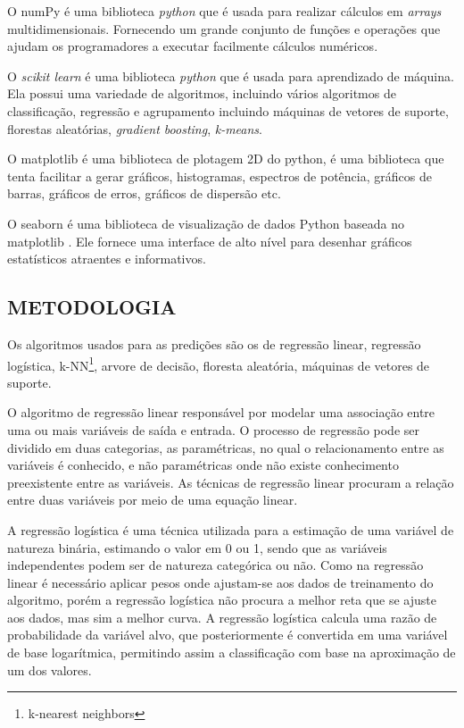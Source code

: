 O numPy é uma biblioteca \textit{python} que é usada para realizar cálculos em \textit{arrays} multidimensionais. Fornecendo um grande conjunto de funções e operações que ajudam os programadores a executar facilmente cálculos numéricos.\cite{numpy}

O \textit{scikit learn} é uma biblioteca \textit{python} que é usada para aprendizado de máquina. Ela possui uma variedade de algoritmos, incluindo vários algoritmos de classificação, regressão e agrupamento incluindo máquinas de vetores de suporte, florestas aleatórias, \textit{gradient boosting}, \textit{k-means}\cite{scikit}.

O matplotlib é uma biblioteca de plotagem 2D do python, é uma biblioteca que tenta facilitar a gerar gráficos, histogramas, espectros de potência, gráficos de barras, gráficos de erros, gráficos de dispersão etc\cite{matplotlib}.

O seaborn é uma biblioteca de visualização de dados Python baseada no matplotlib . Ele fornece uma interface de alto nível para desenhar gráficos estatísticos atraentes e informativos.\cite{seaborn}


\subsection{METODOLOGIA}
Os algoritmos usados para as predições são os de regressão linear, regressão logística, k-NN\footnote{k-nearest neighbors},  arvore de decisão, floresta aleatória, máquinas de vetores de suporte.

O algoritmo de regressão linear responsável por modelar uma associação entre uma ou mais variáveis de saída e entrada. O processo de regressão pode ser dividido em duas categorias, as paramétricas, no qual o relacionamento entre as variáveis é conhecido, e não paramétricas onde não existe conhecimento preexistente entre as variáveis. As técnicas de regressão linear procuram a relação entre duas variáveis por meio de uma equação linear\cite{Bogoni2019}.

A regressão logística é uma técnica utilizada para a estimação de uma variável de natureza binária, estimando o valor em 0 ou 1, sendo que as variáveis independentes podem ser de natureza categórica ou não. Como na regressão linear é
necessário aplicar pesos onde ajustam-se aos dados de treinamento do algoritmo, porém a regressão logística não procura a melhor reta que se ajuste aos dados, mas sim a melhor curva. A regressão logística calcula uma razão de probabilidade da variável alvo, que posteriormente é convertida em uma variável de base logarítmica, permitindo assim a classificação com base na aproximação de um dos valores\cite{Witten2011}.

